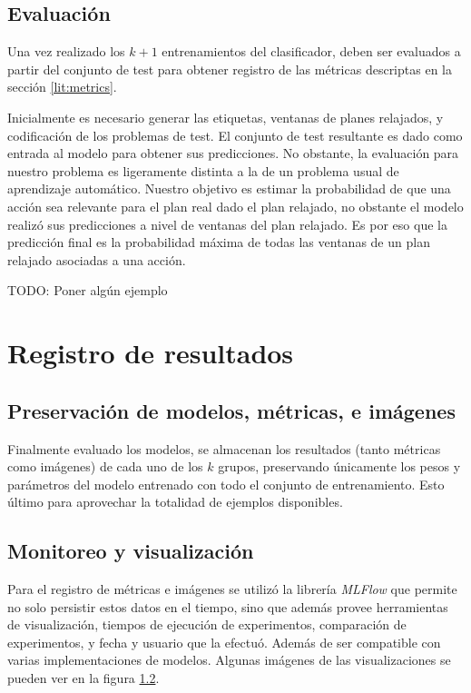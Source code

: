 \subsection{Evaluación}

Una vez realizado los $k + 1$ entrenamientos del clasificador, deben ser evaluados a partir del conjunto de test para obtener registro de las métricas descriptas en la sección \ref{lit:metrics}. 

Inicialmente es necesario generar las etiquetas, ventanas de planes relajados, y codificación de los problemas de test. El conjunto de test resultante es dado como entrada al modelo para obtener sus predicciones. No obstante, la evaluación para nuestro problema es ligeramente distinta a la de un problema usual de aprendizaje automático. Nuestro objetivo es estimar la probabilidad de que una acción sea relevante para el plan real dado el plan relajado, no obstante el modelo realizó sus predicciones a nivel de ventanas del plan relajado. Es por eso que la predicción final es la probabilidad máxima de todas las ventanas de un plan relajado asociadas a una acción.

TODO: Poner algún ejemplo

\section{Registro de resultados}

\subsection{Preservación de modelos, métricas, e imágenes}

Finalmente evaluado los modelos, se almacenan los resultados (tanto métricas como imágenes) de cada uno de los $k$ grupos, preservando únicamente los pesos y parámetros del modelo entrenado con todo el conjunto de entrenamiento. Esto último para aprovechar la totalidad de ejemplos disponibles.

\subsection{Monitoreo y visualización}

Para el registro de métricas e imágenes se utilizó la librería \emph{MLFlow} \cite{} que permite no solo persistir estos datos en el tiempo, sino que además provee herramientas de visualización, tiempos de ejecución de experimentos, comparación de experimentos, y fecha y usuario que la efectuó. Además de ser compatible con varias implementaciones de modelos. Algunas imágenes de las visualizaciones se pueden ver en la figura \ref{}.

